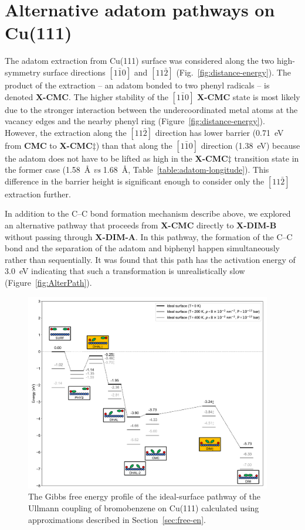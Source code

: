 \documentclass[journal=jpclcd,layout=traditional,manuscript=letter]{achemso} %
\begin{document}
\section{Alternative adatom pathways on Cu(111)}

The adatom extraction from Cu(111) surface was considered along the two high-symmetry surface directions $[1\bar{1}0]$ and $[11\bar{2}]$ (Fig.~\ref{fig:distance-energy}). The product of the extraction -- an adatom bonded to two phenyl radicals -- is denoted \textbf{X-CMC}. The higher stability of the $[1\bar{1}0]$ \textbf{X-CMC} state is most likely due to the stronger interaction between the undercoordinated metal atoms at the vacancy edges and the nearby phenyl ring (Figure~\ref{fig:distance-energy}).
However, the extraction along the $[11\bar{2}]$ direction has lower barrier (\SI{0.71}{\electronvolt} from \textbf{CMC} to \textbf{X-CMC}$\ddagger$) than that along the $[1\bar{1}0]$ direction (\SI{1.38}{\electronvolt}) because the adatom does not have to be lifted as high in the \textbf{X-CMC$\ddagger$} transition state in the former case (\SI{1.58}{\angstrom} \emph{vs} \SI{1.68}{\angstrom}, Table~\ref{table:adatom-longitude}). This difference in the barrier height is significant enough to consider only the $[11\bar{2}]$ extraction further.

In addition to the C--C bond formation mechanism describe above, we explored an alternative pathway that proceeds from \textbf{X-CMC} directly to \textbf{X-DIM-B} without passing through \textbf{X-DIM-A}. In this pathway, the formation of the C--C bond and the separation of the adatom and biphenyl happen simultaneously rather than sequentially. It was found that this path has the activation energy of \SI{3.0}{\electronvolt} indicating that such a transformation is unrealistically slow (Figure~\ref{fig:AlterPath}).


\begin{figure}[bt]
\centering
\includegraphics[width=0.96\textwidth]{Fig/Entropy_ideal.pdf}
\caption{The Gibbs free energy profile of the ideal-surface pathway of the Ullmann coupling of bromobenzene on Cu(111) calculated using approximations described in Section~\ref{sec:free-en}.}
\label{fig:entropy_ideal}
\end{figure}
\end{document}
